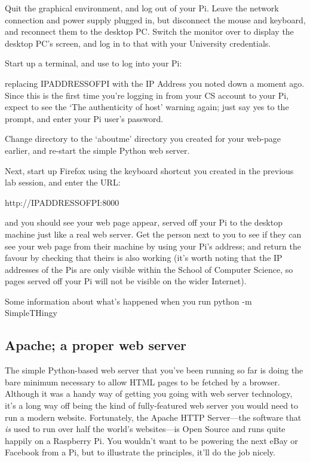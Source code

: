 Quit the graphical environment, and log out of your Pi. Leave the network connection and power supply plugged in, but disconnect the mouse and keyboard, and reconnect them to the desktop PC. Switch the monitor over to display the desktop PC's screen, and log in to that with your University credentials. 

Start up a terminal, and use  to log into your Pi:


replacing IPADDRESSOFPI with the IP Address you noted down a moment ago. Since this is the first time you're logging in from your CS account to your Pi, expect to see the `The authenticity of host' warning again; just say yes to the prompt, and enter your Pi user's password. 

Change directory to the `aboutme' directory you created for your web-page earlier, and re-start the simple Python web server. 

Next, start up Firefox using the keyboard shortcut you created in the previous lab session, and enter the URL:

\begin{ttoutenv}
http://IPADDRESSOFPI:8000
\end{ttoutenv}

and you should see your web page appear, served off your Pi to the desktop machine just like a real web server. Get the person next to you to see if they can see your web page from their machine by using your Pi's address; and return the favour by checking that theirs is also working (it's worth noting that the IP addresses of the Pis are only visible within the School of Computer Science, so pages served off your Pi will not be visible on the wider Internet).

\begin{diversion}
Some information about what's happened when you run python -m SimpleTHingy
\end{diversion}

\subsection{Apache; a proper web server}

The simple Python-based web server that you've been running so far is doing the bare minimum necessary to allow HTML pages to be fetched by a browser. Although it was a handy way of getting you going with web server technology, it's a long way off being the kind of fully-featured web server you would need to run a modern website. Fortunately, the Apache HTTP Server---the software that \textit{is} used to run over half the world's websites---is Open Source and runs quite happily on a Raspberry Pi. You wouldn't want to be powering the next eBay or Facebook from a Pi, but to illustrate the principles, it'll do the job nicely. 

